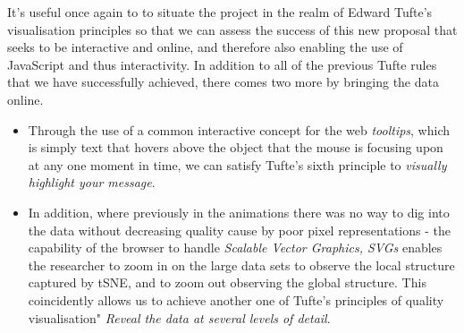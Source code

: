 \documentclass[a4paper,11pt,titlepage]{article}
\begin{document}
	\par 
	It's useful once again to to situate the project in the realm of Edward Tufte's visualisation principles so that we can assess the success of this new proposal that seeks to be interactive and online, and therefore also enabling the use of JavaScript and thus interactivity. In addition to all of the previous Tufte rules that we have successfully achieved, there comes two more by bringing the data online. 
	\begin{itemize}
		\item Through the use of a common interactive concept for the web \textit{tooltips}, which is simply text that hovers above the object that the mouse is focusing upon at any one moment in time, we can satisfy Tufte's sixth principle to \textit{visually highlight your message}. 
		\item In addition, where previously in the animations there was no way to dig into the data without decreasing quality cause by poor pixel representations - the capability of the browser to handle \textit{Scalable Vector Graphics, SVGs} enables the researcher to zoom in on the large data sets to observe the local structure captured by tSNE, and to zoom out observing the global structure. This coincidently allows us to achieve another one of Tufte's principles of quality visualisation" \textit{Reveal the data at several levels of detail}. 
	\end{itemize}
	
\end{document}
